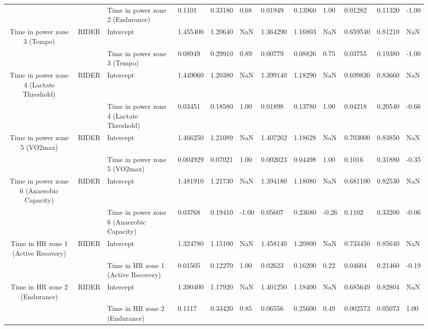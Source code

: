 \begin{tabular}{c}
                                      &       & Time in power zone 2 (Endurance) &    0.1101 &  0.33180 &  0.68 &   0.01949 &  0.13960 &  1.00 &   0.01282 &  0.11320 & -1.00 \\
Time in power zone 3 (Tempo) & RIDER & Intercept &  1.455400 &  1.20640 &   NaN &  1.364290 &  1.16803 &   NaN &  0.659540 &  0.81210 &   NaN \\
                                      &       & Time in power zone 3 (Tempo) &   0.08949 &  0.29910 &  0.89 &   0.00779 &  0.08826 &  0.75 &   0.03755 &  0.19380 & -1.00 \\
Time in power zone 4 (Lactate Threshold) & RIDER & Intercept &  1.449060 &  1.20380 &   NaN &  1.399140 &  1.18290 &   NaN &  0.699830 &  0.83660 &   NaN \\
                                      &       & Time in power zone 4 (Lactate Threshold) &   0.03451 &  0.18580 &  1.00 &   0.01898 &  0.13780 &  1.00 &   0.04218 &  0.20540 & -0.66 \\
Time in power zone 5 (VO2max) & RIDER & Intercept &  1.466250 &  1.21089 &   NaN &  1.407262 &  1.18628 &   NaN &  0.703000 &  0.83850 &   NaN \\
                                      &       & Time in power zone 5 (VO2max) &  0.004929 &  0.07021 &  1.00 &  0.002023 &  0.04498 &  1.00 &    0.1016 &  0.31880 & -0.35 \\
Time in power zone 6 (Anaerobic Capacity) & RIDER & Intercept &  1.481910 &  1.21730 &   NaN &  1.394180 &  1.18080 &   NaN &  0.681100 &  0.82530 &   NaN \\
                                      &       & Time in power zone 6 (Anaerobic Capacity) &   0.03768 &  0.19410 & -1.00 &   0.05607 &  0.23680 & -0.26 &    0.1102 &  0.33200 & -0.06 \\
Time in HR zone 1 (Active Recovery) & RIDER & Intercept &  1.324780 &  1.15100 &   NaN &  1.458140 &  1.20800 &   NaN &  0.733450 &  0.85640 &   NaN \\
                                      &       & Time in HR zone 1 (Active Recovery) &   0.01505 &  0.12270 &  1.00 &   0.02623 &  0.16200 &  0.22 &   0.04604 &  0.21460 & -0.19 \\
Time in HR zone 2 (Endurance) & RIDER & Intercept &  1.390400 &  1.17920 &   NaN &  1.401250 &  1.18400 &   NaN &  0.685649 &  0.82804 &   NaN \\
                                      &       & Time in HR zone 2 (Endurance) &    0.1117 &  0.33420 &  0.85 &   0.06556 &  0.25600 &  0.49 &  0.002573 &  0.05073 &  1.00 \\

\end{tabular}

